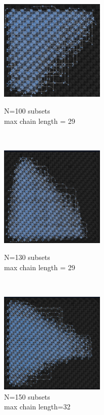 \documentclass[oneside,a4paper]{article}
\begin{document}
\begin{figure}[htp]
\centering
\begin{minipage}[b]{4.5cm}
\centering
\includegraphics[width=5cm]{LaTeXTemplate/Images/Advantagefirst100.png}
\caption{N=100 subsets\\max chain length = 29}
\end{minipage}
\ \hspace{2mm} \hspace{2mm} \
\begin{minipage}[b]{4.5cm}
\centering
\includegraphics[width=5cm]{LaTeXTemplate/Images/Advantagefirst130.png}
\caption{N=130 subsets\\max chain length = 29}
\end{minipage}
\ \hspace{2mm} \hspace{2mm} \
\begin{minipage}[b]{4.5cm}
\centering
\includegraphics[width=5cm]{LaTeXTemplate/Images/Advantagefirst150.png}
\caption{N=150 subsets\\max chain length=32}
\end{minipage}
\end{figure}
\newpage
\end{document}
